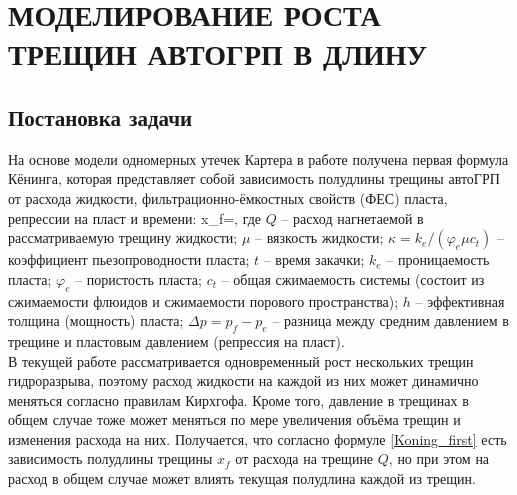 \chapter{МОДЕЛИРОВАНИЕ РОСТА ТРЕЩИН АВТОГРП В ДЛИНУ} \label{ch4}

\section{Постановка задачи}
\vspace*{-5mm}

На основе модели одномерных утечек Картера \cite{karter} в работе \cite{koning} получена первая формула Кёнинга, которая представляет собой зависимость полудлины трещины автоГРП от расхода жидкости, фильтрационно-ёмкостных свойств (ФЕС) пласта, репрессии на пласт и времени:
\beq\label{Koning_first}
x_{\!f}=,
\eeq
где $Q$ -- расход нагнетаемой в рассматриваемую трещину жидкости;
$\mu$ -- вязкость жидкости;
$\kappa=k_e/(\varphi_e\mu c_t)$ -- коэффициент пьезопроводности пласта;
$t$ -- время закачки;
$k_e$ -- проницаемость пласта;
$\varphi_e$ -- пористость пласта;
$c_t$ -- общая сжимаемость системы (состоит из сжимаемости флюидов и сжимаемости порового пространства);
$h$ -- эффективная толщина (мощность) пласта;
$\Delta p=p_{\!f}-p_e$ -- разница между средним давлением в трещине и пластовым давлением (репрессия на пласт).\\

В текущей работе рассматривается одновременный рост нескольких трещин гидроразрыва, поэтому расход жидкости на каждой из них может динамично меняться согласно правилам Кирхгофа.
Кроме того, давление в трещинах в общем случае тоже может меняться по мере увеличения объёма трещин и изменения расхода на них.
Получается, что согласно формуле \eqref{Koning_first} есть зависимость полудлины трещины $x_{\!f}$ от расхода на трещине $Q$, но при этом на расход в общем случае может влиять текущая полудлина каждой из трещин.

